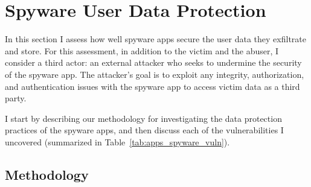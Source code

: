 \section{Spyware User Data Protection}
\label{sec:data-leak}



In this section I assess how well spyware apps secure the user data they exfiltrate and store.
For this assessment, in addition to the victim and the abuser, I
consider a third actor: an external attacker who seeks to undermine the
security of the spyware app.  The attacker's goal is to exploit any
integrity, authorization, and authentication issues with the spyware
app to access victim data as a third party.



I start by describing our
methodology for investigating the data protection practices of the
spyware apps, and then discuss each of the vulnerabilities I uncovered (summarized in Table~\ref{tab:apps_spyware_vuln}).

\subsection{Methodology}
\label{subsec:experiemental_setup}

